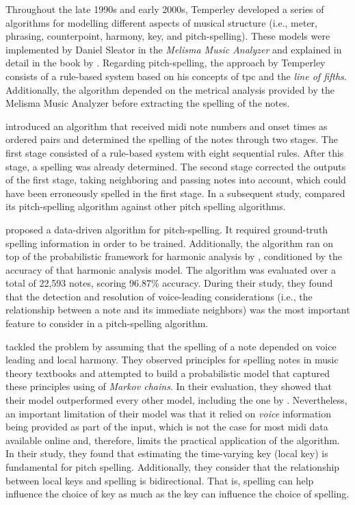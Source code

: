 Throughout the late 1990s and early 2000s, Temperley
developed a series of algorithms for modelling different
aspects of musical structure (i.e., meter, phrasing,
counterpoint, harmony, key, and pitch-spelling). These
models were implemented by Daniel Sleator in the
\emph{Melisma Music Analyzer} and explained in detail in the
book by \textcite{temperley2004cognition}. Regarding
pitch-spelling, the approach by Temperley consists of a
rule-based system based on his concepts of \gls{tpc} and the
\emph{line of fifths}. Additionally, the algorithm depended
on the metrical analysis provided by the Melisma Music
Analyzer before extracting the spelling of the notes.

\textcite{meredith2003pitch} introduced an algorithm that
received \gls{midi} note numbers and onset times as ordered
pairs and determined the spelling of the notes through two
stages. The first stage consisted of a rule-based system
with eight sequential rules. After this stage, a spelling
was already determined. The second stage corrected the
outputs of the first stage, taking neighboring and passing
notes into account, which could have been erroneously
spelled in the first stage. In a subsequent study,
\textcite{meredith2005comparing} compared its pitch-spelling
algorithm against other pitch spelling algorithms.

\textcite{stoddard2004welltempered} proposed a data-driven
algorithm for pitch-spelling. It required ground-truth
spelling information in order to be trained. Additionally,
the algorithm ran on top of the probabilistic framework for
harmonic analysis by \textcite{raphael2003harmonic},
conditioned by the accuracy of that harmonic analysis model.
The algorithm was evaluated over a total of 22,593 notes,
scoring 96.87\% accuracy. During their study, they found
that the detection and resolution of voice-leading
considerations (i.e., the relationship between a note and
its immediate neighbors) was the most important feature to
consider in a pitch-spelling algorithm.

\textcite{teodoru2007pitch} tackled the problem by assuming
that the spelling of a note depended on voice leading and
local harmony. They observed principles for spelling notes
in music theory textbooks
\parencite{aldwell1978harmony,rimskykorsakov2005practical}
and attempted to build a probabilistic model that captured
these principles using of \emph{Markov chains}. In their
evaluation, they showed that their model outperformed every
other model, including the one by
\textcite{meredith2006ps13}. Nevertheless, an important
limitation of their model was that it relied on \emph{voice}
information being provided as part of the input, which is
not the case for most \gls{midi} data available online and,
therefore, limits the practical application of the
algorithm. In their study, they found that estimating the
time-varying key (local key) is fundamental for pitch
spelling. Additionally, they consider that the relationship
between local keys and spelling is bidirectional. That is,
spelling can help influence the choice of key as much as the
key can influence the choice of spelling.
